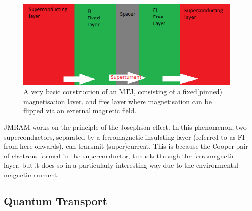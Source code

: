 \documentclass[12pt]{article}
\begin{document}
\begin{figure}[htp]
    \centering
    \begin{measuredfigure}
    \includegraphics[width=12cm]{mtj}
    \caption{A very basic construction of an MTJ, consisting of a fixed(pinned) magnetisation layer, and free layer where magnetisation can be flipped via an external magnetic field.}
    \end{measuredfigure}
    \end{figure} 
    
JMRAM works on the principle of the Josephson effect\cite{josephson}. In this phenomenon, two superconductors, separated by a ferromagnetic insulating layer (referred to as FI from here onwards), can transmit (super)current. This is because the Cooper pair of electrons formed in the superconductor, tunnels through the ferromagnetic layer, but it does so in a particularly interesting way due to the environmental magnetic moment.

\subsection{Quantum Transport}
\end{document}
